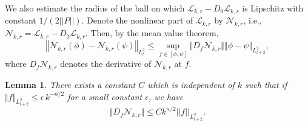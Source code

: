 \documentclass{amsart}
\numberwithin{equation}{section}
\theoremstyle{plain}
\newtheorem{lemma}[equation]{Lemma}
\theoremstyle{definition}
\theoremstyle{remark}
\begin{document}
We also estimate the radius of the ball on which $\mathcal{L}_{k,r} - D_0 \mathcal{L}_{k,r}$ is Lipschitz with constant $1/\left( 2||P|| \right)$.
 Denote the nonlinear part of $\mathcal{L}_{k,r}$ by $\mathcal{N}_{k,r}$, i.e., $\mathcal{N}_{k,r} = \mathcal{L}_{k,r} - D_0 \mathcal{L}_{k,r}$. Then, by the mean value theorem,
 $$ \left\Vert \mathcal{N}_{k,r} (\phi) - \mathcal{N}_{k,r} (\psi) \right\Vert_{L^2_l} 
\le 
\sup_{f \in [\phi, \psi]} \Vert D_f \mathcal{N}_{k,r} \Vert
\left\Vert \phi - \psi \right\Vert_{L^2_{l+2}},$$
where $D_f \mathcal{N}_{k,r}$ denotes the derivative of $\mathcal{N}_{k,r}$ at $f$.

\begin{lemma}\label{lem:lipschitz}
There exists a constant $C$ which is independent of $k$ such that if 
$ \Vert f \Vert_{L^2_{l+2}} \le \epsilon \, k^{-n/2}$ for a small constant $\epsilon$, 
we have 
$$\Vert D_f \mathcal{N}_{k,r} \Vert
\le 
C k^{n/2} ||f||_{L^2_{l+2}}.$$
\end{lemma}
\end{document}
